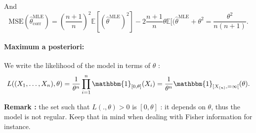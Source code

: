 And $$\text{MSE}(\hat{\theta}_{\text{corr}}^{\text{MLE}}) = \left(\dfrac{n+1}{n}\right)^2 \mathbb{E}[(\hat{\theta}^{\text{MLE}})^2] - 2\dfrac{n+1}{n}\theta \mathbb{E}[(\hat{\theta}^{\text{MLE}} + \theta^2 = \dfrac{\theta^2}{n(n+1)}.$$

\paragraph*{Maximum a posteriori:}

We write the likelihood of the model in terms of $\theta$ :
$$L((X_1,\dots,X_n), \theta) = \dfrac{1}{\theta^n} \prod_{i=1}^{n} \mathbbm{1}_{[0, \theta]}(X_i) = \dfrac{1}{\theta^n} \mathbbm{1}_{[X_{(n)}, =\infty[}(\theta).$$

\textbf{Remark :} the set such that $L(., \theta)>0$ is $[0, \theta]$ : it depends on $\theta$, thus the model is not regular. Keep that in mind when dealing with Fisher information for instance.\newline

